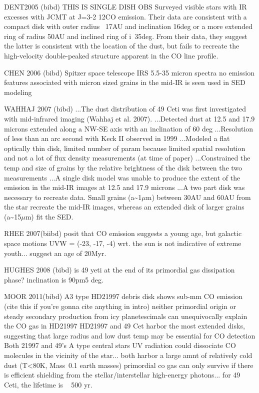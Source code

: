 DENT2005 (bibd) THIS IS SINGLE DISH OBS
Surveyed visible stars with IR excesses with JCMT at J=3-2 12CO emission. Their data are consistent with a compact disk with outer radius ~17AU and inclination 16deg or a more extended ring of radius 50AU and inclined ring of i~35deg. From their data, they suggest the latter is consistent with the location of the dust, but fails to recreate the high-velocity double-peaked structure apparent in the CO line profile. 

CHEN 2006 (bibd)
Spitzer space telescope IRS 5.5-35 micron spectra
no emission features associated with micron sized grains in the mid-IR is seen
used in SED modeling

WAHHAJ 2007 (bibd)
...The dust distribution of 49 Ceti was first investigated with mid-infrared imaging \citep{Wahhaj07}(Wahhaj et al. 2007).
...Detected dust at 12.5 and 17.9 microns extended along a NW-SE axis with an inclination of 60 deg
...Resolution of less than an arc second with Keck II observed in 1999 
...Modeled a flat optically thin disk, limited number of param because limited spatial resolution and not a lot of flux density measurements (at time of paper)
...Constrained the temp and size of grains by the relative brightness of the disk between the two measurements
...A single disk model was unable to produce the extent of the emission in the mid-IR images at 12.5 and 17.9 microns
...A two part disk was necessary to recreate data. Small grains (a\textasciitilde1$\mu$m) between 30AU and 60AU from the star recreate the mid-IR images, whereas an extended disk of larger grains (a\textasciitilde15$\mu$m) fit the SED. 


RHEE 2007(biibd)
posit that CO emission suggests a young age, but galactic space motions UVW = (-23, -17, -4) wrt. the sun is not indicative of extreme youth... suggest an age of 20Myr. 

HUGHES 2008 (bibd)
is 49 yeti at the end of its primordial gas dissipation phase? 
inclination is 90pm5 deg.

MOOR 2011(bibd)
A3 type HD21997 debris disk shows sub-mm CO emission (cite this if you're gonna cite anything in intro)
neither primordial origin or steady secondary production from icy planetescimals can unequivocally explain the CO gas in HD21997
HD21997 and 49 Cet harbor the most extended disks, suggesting that large radius and low dust temp may be essential for CO detection
Both 21997 and 49's A type central stars UV radiation could dissociate CO molecules in the vicinity of the star... both harbor a large amnt of relatively cold dust (T<80K, Mass~0.1 earth masses)
primordial co gas can only survive if there is efficient shielding from the stellar/interstellar high-energy photons... for 49 Ceti, the lifetime is ~ 500 yr. 

